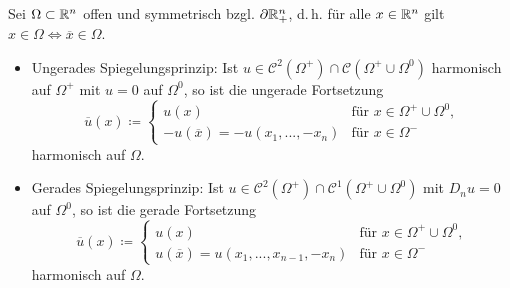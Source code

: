 \documentclass{cheat-sheet}
\begin{document}
\begin{satz}
  Sei $\Omega \subset \mathbb{R}^n$ offen und symmetrisch bzgl. $\partial \mathbb{R}^n_+$, d.\,h. für alle $x \in \mathbb{R}^n$ gilt $x \in \Omega \iff \overline{x} \in \Omega$.
  \begin{itemize}
    \item Ungerades Spiegelungsprinzip: Ist $u \in \mathcal{C}^2(\Omega^+) \cap \mathcal{C}(\Omega^+ \cup \Omega^0)$ harmonisch auf $\Omega^+$ mit $u = 0$ auf $\Omega^0$, so ist die ungerade Fortsetzung
    \[
      \overline{u}(x) \coloneqq \begin{cases}
        u(x) & \text{für $x \in \Omega^+ \cup \Omega^0$,}\\
        -u(\overline{x}) = -u(x_1, ..., -x_n) & \text{für $x \in \Omega^-$}
      \end{cases}
    \]
    harmonisch auf $\Omega$.
    \item Gerades Spiegelungsprinzip: Ist $u \in \mathcal{C}^2(\Omega^+) \cap \mathcal{C}^1(\Omega^+ \cup \Omega^0)$ mit $D_n u = 0$ auf $\Omega^0$, so ist die gerade Fortsetzung
    \[
      \overline{u}(x) \coloneqq \begin{cases}
        u(x) & \text{für $x \in \Omega^+ \cup \Omega^0$,}\\
        u(\overline{x}) = u(x_1, ..., x_{n-1}, -x_n) & \text{für $x \in \Omega^-$}
      \end{cases}
    \]
    harmonisch auf $\Omega$.
  \end{itemize}
\end{satz}


\end{document}

